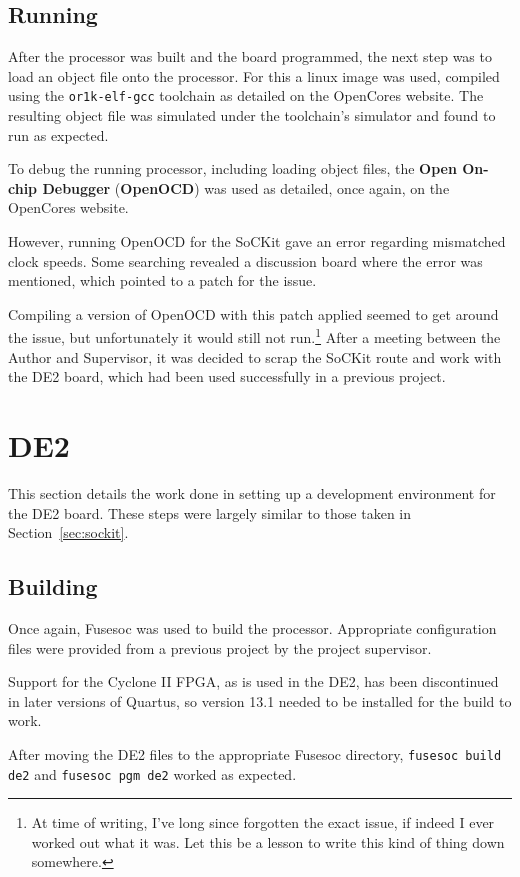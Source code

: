 \subsection{Running}
After the processor was built and the board programmed, the next step was to load an object file onto the processor. For this a linux image was used, compiled using the \texttt{or1k-elf-gcc} toolchain as detailed on the OpenCores website\cite{or1k-linux}. The resulting object file was simulated under the toolchain's simulator and found to run as expected.

To debug the running processor, including loading object files, the \textbf{Open On-chip Debugger} (\textbf{OpenOCD}) was used as detailed, once again, on the OpenCores website\cite{or1k-openocd}.

However, running OpenOCD for the SoCKit gave an error regarding mismatched clock speeds. Some searching revealed a discussion board\cite{openocd-sockit} where the error was mentioned, which pointed to a patch for the issue\cite{openocd-fix}.

Compiling a version of OpenOCD with this patch applied seemed to get around the issue, but unfortunately it would still not run.\footnote{At time of writing, I've long since forgotten the exact issue, if indeed I ever worked out what it was. Let this be a lesson to write this kind of thing down somewhere.} After a meeting between the Author and Supervisor, it was decided to scrap the SoCKit route and work with the DE2 board, which had been used successfully in a previous project.

\section{DE2}
This section details the work done in setting up a development environment for the DE2 board. These steps were largely similar to those taken in Section~\ref{sec:sockit}.

\subsection{Building}
Once again, Fusesoc was used to build the processor. Appropriate configuration files were provided from a previous project by the project supervisor.

Support for the Cyclone II FPGA, as is used in the DE2, has been discontinued in later versions of Quartus, so version 13.1 needed to be installed for the build to work.

After moving the DE2 files to the appropriate Fusesoc directory, \texttt{fusesoc build de2} and \texttt{fusesoc pgm de2} worked as expected.

